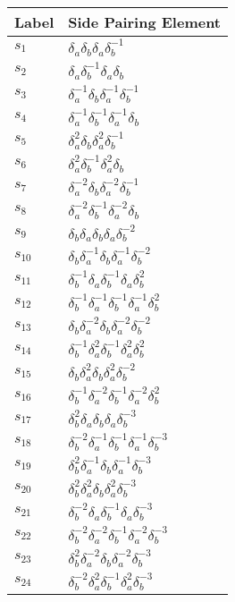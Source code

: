 \documentclass{article}
\begin{document}
\begin{center}
\begin{tabular}{ll}
\end{tabular}
\hfill
\begin{tabular}{ll}
\toprule
Label & Side Pairing Element\\
\midrule
$s_{1}$ & $\delta_a^{}\delta_b^{}\delta_a^{}\delta_b^{-1}$ \\
$s_{2}$ & $\delta_a^{}\delta_b^{-1}\delta_a^{}\delta_b^{}$ \\
$s_{3}$ & $\delta_a^{-1}\delta_b^{}\delta_a^{-1}\delta_b^{-1}$ \\
$s_{4}$ & $\delta_a^{-1}\delta_b^{-1}\delta_a^{-1}\delta_b^{}$ \\
$s_{5}$ & $\delta_a^{2}\delta_b^{}\delta_a^{2}\delta_b^{-1}$ \\
$s_{6}$ & $\delta_a^{2}\delta_b^{-1}\delta_a^{2}\delta_b^{}$ \\
$s_{7}$ & $\delta_a^{-2}\delta_b^{}\delta_a^{-2}\delta_b^{-1}$ \\
$s_{8}$ & $\delta_a^{-2}\delta_b^{-1}\delta_a^{-2}\delta_b^{}$ \\
$s_{9}$ & $\delta_b^{}\delta_a^{}\delta_b^{}\delta_a^{}\delta_b^{-2}$ \\
$s_{10}$ & $\delta_b^{}\delta_a^{-1}\delta_b^{}\delta_a^{-1}\delta_b^{-2}$ \\
$s_{11}$ & $\delta_b^{-1}\delta_a^{}\delta_b^{-1}\delta_a^{}\delta_b^{2}$ \\
$s_{12}$ & $\delta_b^{-1}\delta_a^{-1}\delta_b^{-1}\delta_a^{-1}\delta_b^{2}$ \\
$s_{13}$ & $\delta_b^{}\delta_a^{-2}\delta_b^{}\delta_a^{-2}\delta_b^{-2}$ \\
$s_{14}$ & $\delta_b^{-1}\delta_a^{2}\delta_b^{-1}\delta_a^{2}\delta_b^{2}$ \\
$s_{15}$ & $\delta_b^{}\delta_a^{2}\delta_b^{}\delta_a^{2}\delta_b^{-2}$ \\
$s_{16}$ & $\delta_b^{-1}\delta_a^{-2}\delta_b^{-1}\delta_a^{-2}\delta_b^{2}$ \\
$s_{17}$ & $\delta_b^{2}\delta_a^{}\delta_b^{}\delta_a^{}\delta_b^{-3}$ \\
$s_{18}$ & $\delta_b^{-2}\delta_a^{-1}\delta_b^{-1}\delta_a^{-1}\delta_b^{-3}$ 
\\
$s_{19}$ & $\delta_b^{2}\delta_a^{-1}\delta_b^{}\delta_a^{-1}\delta_b^{-3}$ \\
$s_{20}$ & $\delta_b^{2}\delta_a^{2}\delta_b^{}\delta_a^{2}\delta_b^{-3}$ \\
$s_{21}$ & $\delta_b^{-2}\delta_a^{}\delta_b^{-1}\delta_a^{}\delta_b^{-3}$ \\
$s_{22}$ & $\delta_b^{-2}\delta_a^{-2}\delta_b^{-1}\delta_a^{-2}\delta_b^{-3}$ 
\\
$s_{23}$ & $\delta_b^{2}\delta_a^{-2}\delta_b^{}\delta_a^{-2}\delta_b^{-3}$ \\
$s_{24}$ & $\delta_b^{-2}\delta_a^{2}\delta_b^{-1}\delta_a^{2}\delta_b^{-3}$ \\
\bottomrule
\end{tabular}
\end{center}

\thispagestyle{empty}
\end{document}
